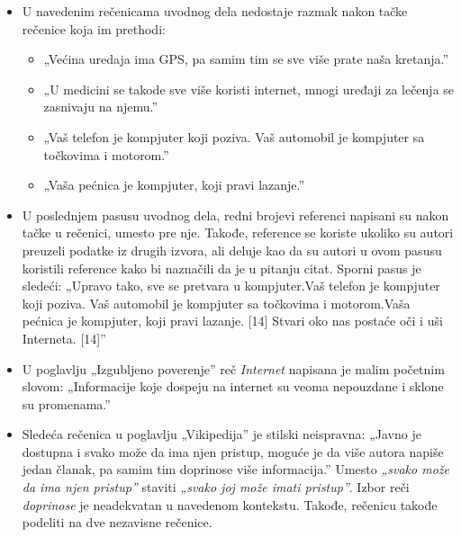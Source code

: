 \documentclass[a4paper]{report}
\begin{document}
\begin{itemize}
    \item U navedenim rečenicama uvodnog dela nedostaje razmak nakon tačke rečenice koja im prethodi:
    \begin{itemize}
        \item „Većina uredaja ima GPS, pa samim tim se sve više prate naša kretanja.”
    \end{itemize}
    \begin{itemize}
        \item „U medicini se takode sve više koristi internet, mnogi uređaji za lečenja se zasnivaju na njemu.”
    \end{itemize}
    \begin{itemize}
        \item „Vaš telefon je kompjuter koji poziva. Vaš automobil je kompjuter sa točkovima i motorom.”
    \end{itemize}
        \begin{itemize}
        \item „Vaša pećnica je kompjuter, koji pravi lazanje.”
    \end{itemize}
\end{itemize}
\begin{itemize}
    \item U poslednjem pasusu uvodnog dela, redni brojevi referenci napisani su nakon tačke u rečenici, umesto pre nje. Takođe, reference se koriste ukoliko su autori preuzeli podatke iz drugih izvora, ali deluje kao da su autori u ovom pasusu koristili reference kako bi naznačili da je u pitanju citat. Sporni pasus je sledeći: \newline
    „Upravo tako, sve se pretvara u kompjuter.Vaš telefon je kompjuter koji poziva. Vaš automobil je kompjuter sa točkovima i motorom.Vaša pećnica je kompjuter, koji pravi lazanje. [14] Stvari oko nas postaće oči i uši Interneta. [14]”
\end{itemize}
\begin{itemize}
    \item U poglavlju „Izgubljeno poverenje” reč \textit{Internet} napisana je malim početnim slovom:\newline
    „Informacije koje dospeju na internet su veoma nepouzdane i sklone su promenama.”
\end{itemize}
\begin{itemize}
    \item  Sledeća rečenica u poglavlju „Vikipedija” je stilski neispravna:\newline
    „Javno je dostupna i svako može da ima njen pristup, moguće je da više autora napiše jedan članak, pa samim tim doprinose više informacija.”\newline
    Umesto \textit{„svako može da ima njen pristup”} staviti \textit{„svako joj može imati pristup”}. Izbor reči \textit{doprinose} je neadekvatan u navedenom kontekstu. Takođe, rečenicu takođe podeliti na dve nezavisne rečenice.
\end{itemize}
\end{document}
